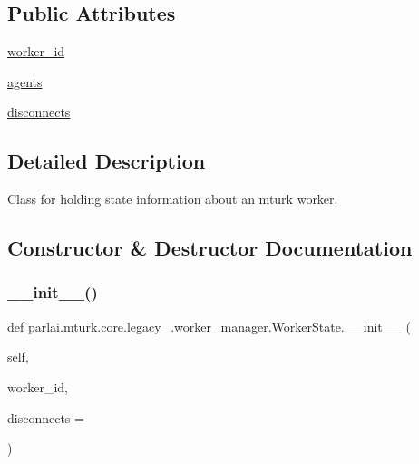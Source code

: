 \subsection*{Public Attributes}
\begin{DoxyCompactItemize}
\item 
\hyperlink{classparlai_1_1mturk_1_1core_1_1legacy__2018_1_1worker__manager_1_1WorkerState_ac69bbf7c4bfd34eb297ae091523f46b5}{worker\+\_\+id}
\item 
\hyperlink{classparlai_1_1mturk_1_1core_1_1legacy__2018_1_1worker__manager_1_1WorkerState_a4165b5a0b9ffcbd8194fd10adeb02fdb}{agents}
\item 
\hyperlink{classparlai_1_1mturk_1_1core_1_1legacy__2018_1_1worker__manager_1_1WorkerState_ac510ecfdd12ff572cb5ad16629dbd36e}{disconnects}
\end{DoxyCompactItemize}


\subsection{Detailed Description}
\begin{DoxyVerb}Class for holding state information about an mturk worker.
\end{DoxyVerb}
 

\subsection{Constructor \& Destructor Documentation}
\mbox{\label{classparlai_1_1mturk_1_1core_1_1legacy__2018_1_1worker__manager_1_1WorkerState_a1f84cd0e83112d5758bdb17b0793f309}} 
\subsubsection{\texorpdfstring{\+\_\+\+\_\+init\+\_\+\+\_\+()}{\_\_init\_\_()}}
{\footnotesize\ttfamily def parlai.\+mturk.\+core.\+legacy\+\_.\+worker\+\_\+manager.\+Worker\+State.\+\_\+\+\_\+init\+\_\+\+\_\+ (\begin{DoxyParamCaption}\item[{}]{self,  }\item[{}]{worker\+\_\+id,  }\item[{}]{disconnects = {} }\end{DoxyParamCaption})}


